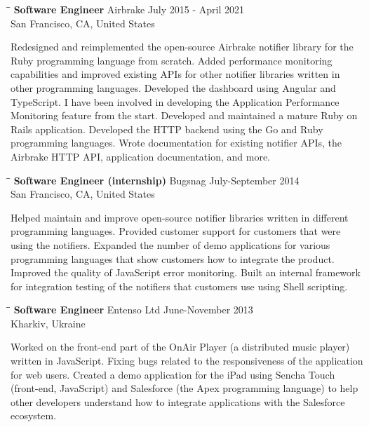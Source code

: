 \documentclass{res}
\begin{document}
\begin{resume}
  \begin{tabbing}
    \hspace{2.3in}\= \hspace{2.6in}\= \kill
    {\bf Software Engineer}  \>Airbrake \> \hspace{-0.3in} July 2015 - April 2021\\
    \>San Francisco, CA, United States
  \end{tabbing}\vspace{-20pt}
  Redesigned and reimplemented the open-source Airbrake notifier library for the
  Ruby programming language from scratch. Added performance monitoring
  capabilities and improved existing APIs for other notifier libraries written
  in other programming languages. Developed the dashboard using Angular and
  TypeScript. I have been involved in developing the Application Performance
  Monitoring feature from the start. Developed and maintained a mature Ruby on
  Rails application. Developed the HTTP backend using the Go and Ruby
  programming languages. Wrote documentation for existing notifier APIs, the
  Airbrake HTTP API, application documentation, and more.


  \begin{tabbing}
    \hspace{2.3in}\= \hspace{2.6in}\= \kill
    {\bf Software Engineer (internship)}  \>Bugsnag \> \hspace{-0.2in} July-September  2014\\
    \>San Francisco, CA, United States
  \end{tabbing}\vspace{-20pt}
  Helped maintain and improve open-source notifier libraries written in
  different programming languages. Provided customer support for customers that
  were using the notifiers. Expanded the number of demo applications for various
  programming languages that show customers how to integrate the product.
  Improved the quality of JavaScript error monitoring. Built an internal
  framework for integration testing of the notifiers that customers use using
  Shell scripting.

  \begin{tabbing}
    \hspace{2.3in}\= \hspace{2.6in}\= \kill
    {\bf Software Engineer}  \>Entenso Ltd \> \hspace{-0.2in} June-November 2013\\
    \>Kharkiv, Ukraine
  \end{tabbing}\vspace{-20pt}
  Worked on the front-end part of the OnAir Player (a distributed music player)
  written in JavaScript. Fixing bugs related to the responsiveness of the
  application for web users. Created a demo application for the iPad using
  Sencha Touch (front-end, JavaScript) and Salesforce (the Apex programming
  language) to help other developers understand how to integrate applications
  with the Salesforce ecosystem.


\end{resume}
\end{document}
